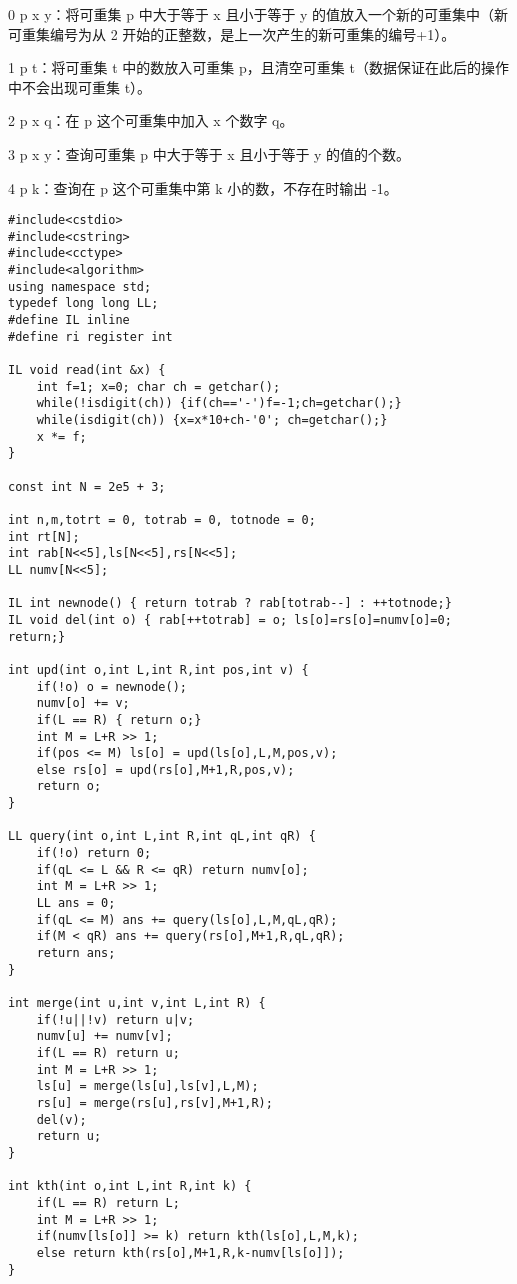 \documentclass[UTF8]{ctexart}
\begin{document}
0 p x y：将可重集 p 中大于等于 x 且小于等于 y 的值放入一个新的可重集中（新可重集编号为从 2 开始的正整数，是上一次产生的新可重集的编号+1）。

1 p t：将可重集 t 中的数放入可重集 p，且清空可重集 t（数据保证在此后的操作中不会出现可重集 t）。

2 p x q：在 p 这个可重集中加入 x 个数字 q。

3 p x y：查询可重集 p 中大于等于 x 且小于等于 y 的值的个数。

4 p k：查询在 p 这个可重集中第 k 小的数，不存在时输出 -1。

\begin{framed}
\begin{lstlisting}
#include<cstdio>
#include<cstring>
#include<cctype>
#include<algorithm>
using namespace std;
typedef long long LL;
#define IL inline
#define ri register int

IL void read(int &x) {
    int f=1; x=0; char ch = getchar();
    while(!isdigit(ch)) {if(ch=='-')f=-1;ch=getchar();}
    while(isdigit(ch)) {x=x*10+ch-'0'; ch=getchar();}
    x *= f;
}

const int N = 2e5 + 3;

int n,m,totrt = 0, totrab = 0, totnode = 0;
int rt[N];
int rab[N<<5],ls[N<<5],rs[N<<5];
LL numv[N<<5];

IL int newnode() { return totrab ? rab[totrab--] : ++totnode;}
IL void del(int o) { rab[++totrab] = o; ls[o]=rs[o]=numv[o]=0; return;}

int upd(int o,int L,int R,int pos,int v) {
    if(!o) o = newnode();
    numv[o] += v;
    if(L == R) { return o;}
    int M = L+R >> 1;
    if(pos <= M) ls[o] = upd(ls[o],L,M,pos,v);
    else rs[o] = upd(rs[o],M+1,R,pos,v);
    return o;
}

LL query(int o,int L,int R,int qL,int qR) {
    if(!o) return 0;
    if(qL <= L && R <= qR) return numv[o];
    int M = L+R >> 1;
    LL ans = 0;
    if(qL <= M) ans += query(ls[o],L,M,qL,qR);
    if(M < qR) ans += query(rs[o],M+1,R,qL,qR);
    return ans;
}

int merge(int u,int v,int L,int R) {
    if(!u||!v) return u|v;
    numv[u] += numv[v];
    if(L == R) return u;
    int M = L+R >> 1;
    ls[u] = merge(ls[u],ls[v],L,M);
    rs[u] = merge(rs[u],rs[v],M+1,R);
    del(v);
    return u;
}

int kth(int o,int L,int R,int k) {
    if(L == R) return L;
    int M = L+R >> 1;
    if(numv[ls[o]] >= k) return kth(ls[o],L,M,k);
    else return kth(rs[o],M+1,R,k-numv[ls[o]]);
}


\end{lstlisting}
\end{framed}
\end{document}
